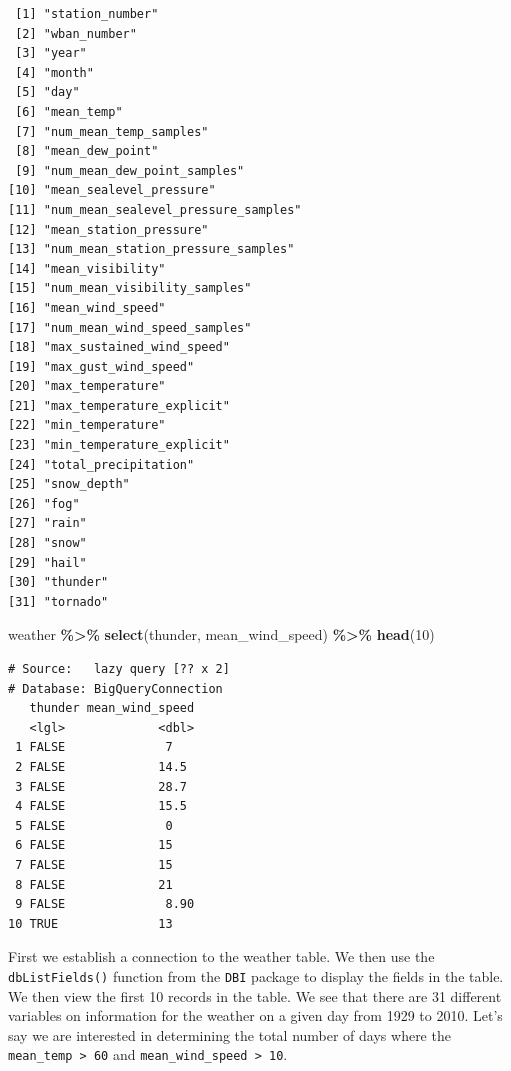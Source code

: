 \documentclass[
]{krantz}
\makeatletter
\newenvironment{Shaded}{\begin{snugshade}}{\end{snugshade}}
\newcommand{\DecValTok}[1]{\textcolor[rgb]{0.06,0.06,0.06}{#1}}
\newcommand{\KeywordTok}[1]{\textcolor[rgb]{0.27,0.27,0.27}{\textbf{#1}}}
\newcommand{\NormalTok}[1]{#1}
\newcommand{\OperatorTok}[1]{\textcolor[rgb]{0.43,0.43,0.43}{\textbf{#1}}}
\newcommand{\StringTok}[1]{\textcolor[rgb]{0.5,0.5,0.5}{#1}}
\newenvironment{kframe}{%
\medskip{}
\setlength{\fboxsep}{.8em}
 \def\at@end@of@kframe{}%
 \ifinner\ifhmode%
  \def\at@end@of@kframe{\end{minipage}}%
  \begin{minipage}{\columnwidth}%
 \fi\fi%
 \def\FrameCommand##1{\hskip\@totalleftmargin \hskip-\fboxsep
 \colorbox{shadecolor}{##1}\hskip-\fboxsep
     \hskip-\linewidth \hskip-\@totalleftmargin \hskip\columnwidth}%
 \MakeFramed {\advance\hsize-\width
   \@totalleftmargin\z@ \linewidth\hsize
   \@setminipage}}%
 {\par\unskip\endMakeFramed%
 \at@end@of@kframe}
\renewenvironment{Shaded}{\begin{kframe}}{\end{kframe}}
\makeatother
\begin{document}
\begin{verbatim}
 [1] "station_number"                    
 [2] "wban_number"                       
 [3] "year"                              
 [4] "month"                             
 [5] "day"                               
 [6] "mean_temp"                         
 [7] "num_mean_temp_samples"             
 [8] "mean_dew_point"                    
 [9] "num_mean_dew_point_samples"        
[10] "mean_sealevel_pressure"            
[11] "num_mean_sealevel_pressure_samples"
[12] "mean_station_pressure"             
[13] "num_mean_station_pressure_samples" 
[14] "mean_visibility"                   
[15] "num_mean_visibility_samples"       
[16] "mean_wind_speed"                   
[17] "num_mean_wind_speed_samples"       
[18] "max_sustained_wind_speed"          
[19] "max_gust_wind_speed"               
[20] "max_temperature"                   
[21] "max_temperature_explicit"          
[22] "min_temperature"                   
[23] "min_temperature_explicit"          
[24] "total_precipitation"               
[25] "snow_depth"                        
[26] "fog"                               
[27] "rain"                              
[28] "snow"                              
[29] "hail"                              
[30] "thunder"                           
[31] "tornado"                           
\end{verbatim}

\begin{Shaded}
\begin{Highlighting}[]
\NormalTok{weather }\OperatorTok{\%\textgreater{}\%}
\StringTok{  }\KeywordTok{select}\NormalTok{(thunder, mean\_wind\_speed) }\OperatorTok{\%\textgreater{}\%}
\StringTok{  }\KeywordTok{head}\NormalTok{(}\DecValTok{10}\NormalTok{)}
\end{Highlighting}
\end{Shaded}

\begin{verbatim}
# Source:   lazy query [?? x 2]
# Database: BigQueryConnection
   thunder mean_wind_speed
   <lgl>             <dbl>
 1 FALSE              7   
 2 FALSE             14.5 
 3 FALSE             28.7 
 4 FALSE             15.5 
 5 FALSE              0   
 6 FALSE             15   
 7 FALSE             15   
 8 FALSE             21   
 9 FALSE              8.90
10 TRUE              13   
\end{verbatim}

First we establish a connection to the weather table. We then use the \texttt{dbListFields()} function from the \texttt{DBI} package to display the fields in the table. We then view the first 10 records in the table. We see that there are 31 different variables on information for the weather on a given day from 1929 to 2010. Let's say we are interested in determining the total number of days where the \texttt{mean\_temp\ \textgreater{}\ 60} and \texttt{mean\_wind\_speed\ \textgreater{}\ 10}.
\end{document}
